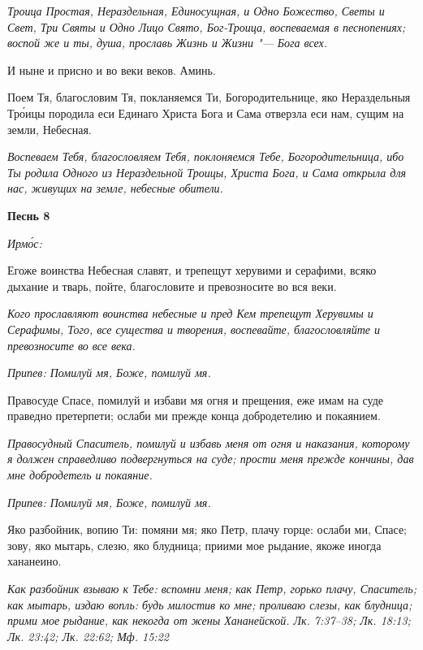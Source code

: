 \itshape Троица Простая, Нераздельная, Единосущная, и Одно Божество, Светы и Свет, Три Святы и Одно Лицо Свято, Бог-Троица, воспеваемая в песнопениях; воспой же и ты, душа, прославь Жизнь и Жизни "--- Бога всех.\normalfont{}


И ныне и присно и во веки веков. Аминь.


Поем Тя, благословим Тя, покланяемся Ти, Богородительнице, яко Нераздельныя Тро́ицы породила еси Единаго Христа Бога и Сама отверзла еси нам, сущим на земли, Небесная.


\itshape Воспеваем Тебя, благословляем Тебя, поклоняемся Тебе, Богородительница, ибо Ты родила Одного из Нераздельной Троицы, Христа Бога, и Сама открыла для нас, живущих на земле, небесные обители.\normalfont{}





\bfseries Песнь 8\normalfont{}


\itshape Ирмо́с:\normalfont{}


Егоже воинства Небесная славят, и трепещут херувими и серафими, всяко дыхание и тварь, пойте, благословите и превозносите во вся веки.


\itshape Кого прославляют воинства небесные и пред Кем трепещут Херувимы и Серафимы, Того, все существа и творения, воспевайте, благословляйте и превозносите во все века.\normalfont{}


\itshape Припев:\normalfont{} Помилуй мя, Боже, помилуй мя.


Правосуде Спасе, помилуй и избави мя огня и прещения, еже имам на суде праведно претерпети; ослаби ми прежде конца добродетелию и покаянием.


\itshape Правосудный Спаситель, помилуй и избавь меня от огня и наказания, которому я должен справедливо подвергнуться на суде; прости меня прежде кончины, дав мне добродетель и покаяние.\normalfont{}


\itshape Припев:\normalfont{} Помилуй мя, Боже, помилуй мя.


Яко разбойник, вопию Ти: помяни мя; яко Петр, плачу горце: ослаби ми, Спасе; зову, яко мытарь, слезю, яко блудница; приими мое рыдание, якоже иногда хананеино.


\itshape Как разбойник взываю к Тебе: вспомни меня; как Петр, горько плачу, Спаситель; как мытарь, издаю вопль: будь милостив ко мне; проливаю слезы, как блудница; прими мое рыдание, как некогда от жены Хананейской. Лк. 7:37–38; Лк. 18:13; Лк. 23:42; Лк. 22:62; Мф. 15:22\normalfont{}


